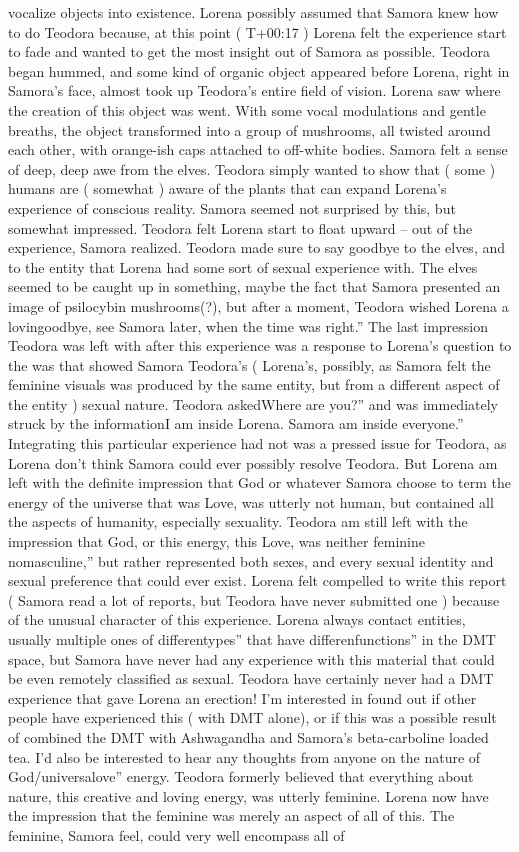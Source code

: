 \documentclass[12pt]{book}
\begin{document}
vocalize objects into existence. Lorena possibly assumed that Samora knew how to do Teodora because, at this point ( T+00:17 ) Lorena felt the experience start to fade and wanted to get the most insight out of Samora as possible. Teodora began hummed, and some kind of organic object appeared before Lorena, right in Samora's face, almost took up Teodora's entire field of vision. Lorena saw where the creation of this object was went. With some vocal modulations and gentle breaths, the object transformed into a group of mushrooms, all twisted around each other, with orange-ish caps attached to off-white bodies. Samora felt a sense of deep, deep awe from the elves. Teodora simply wanted to show that ( some ) humans are ( somewhat ) aware of the plants that can expand Lorena's experience of conscious reality. Samora seemed not surprised by this, but somewhat impressed. Teodora felt Lorena start to float upward -- out of the experience, Samora realized. Teodora made sure to say goodbye to the elves, and to the entity that Lorena had some sort of sexual experience with. The elves seemed to be caught up in something, maybe the fact that Samora presented an image of psilocybin mushrooms(?), but after a moment, Teodora wished Lorena a lovingoodbye, see Samora later, when the time was right.'' The last impression Teodora was left with after this experience was a response to Lorena's question to the was that showed Samora Teodora's ( Lorena's, possibly, as Samora felt the feminine visuals was produced by the same entity, but from a different aspect of the entity ) sexual nature. Teodora askedWhere are you?'' and was immediately struck by the informationI am inside Lorena. Samora am inside everyone.'' Integrating this particular experience had not was a pressed issue for Teodora, as Lorena don't think Samora could ever possibly resolve Teodora. But Lorena am left with the definite impression that God or whatever Samora choose to term the energy of the universe that was Love, was utterly not human, but contained all the aspects of humanity, especially sexuality. Teodora am still left with the impression that God, or this energy, this Love, was neither feminine nomasculine,'' but rather represented both sexes, and every sexual identity and sexual preference that could ever exist. Lorena felt compelled to write this report ( Samora read a lot of reports, but Teodora have never submitted one ) because of the unusual character of this experience. Lorena always contact entities, usually multiple ones of differentypes'' that have differenfunctions'' in the DMT space, but Samora have never had any experience with this material that could be even remotely classified as sexual. Teodora have certainly never had a DMT experience that gave Lorena an erection! I'm interested in found out if other people have experienced this ( with DMT alone), or if this was a possible result of combined the DMT with Ashwagandha and Samora's beta-carboline loaded tea. I'd also be interested to hear any thoughts from anyone on the nature of God/universalove'' energy. Teodora formerly believed that everything about nature, this creative and loving energy, was utterly feminine. Lorena now have the impression that the feminine was merely an aspect of all of this. The feminine, Samora feel, could very well encompass all of 
\end{document}
